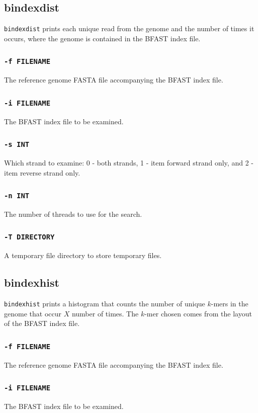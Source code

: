 \documentclass[a4paper,12pt]{book}
\newcommand{\TT}[1]{{\tt #1}} %
\newcommand{\rGFF}{reference genome FASTA file}
\newcommand{\BIF}{BFAST index file} %
\begin{document}
\subsection{bindexdist}
\label{sec:bindexdist}
\TT{bindexdist} prints each unique read from the genome and the number of times it occurs, where the genome is contained in the \BIF{}.

\subsubsection{\TT{-f FILENAME}}
The \rGFF{} accompanying the \BIF{}.

\subsubsection{\TT{-i FILENAME}}
The \BIF{} to be examined.

\subsubsection{\TT{-s INT}}
Which strand to examine: 0 - both strands, 1 - item forward strand only, and 2 - item reverse strand only.

\subsubsection{\TT{-n INT}}
The number of threads to use for the search.

\subsubsection{\TT{-T DIRECTORY}}
A temporary file directory to store temporary files.

\subsection{bindexhist}
\label{sec:bindexhist}
\TT{bindexhist} prints a histogram that counts the number of unique $k$-mers in the genome that occur $X$ number of
times.  
The $k$-mer chosen comes from the layout of the \BIF{}.

\subsubsection{\TT{-f FILENAME}}
The \rGFF{} accompanying the \BIF{}.

\subsubsection{\TT{-i FILENAME}}
The \BIF{} to be examined.
\end{document}
